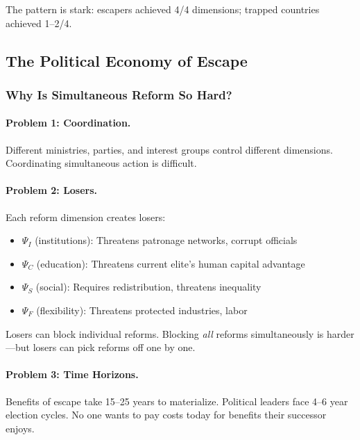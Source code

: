 The pattern is stark: escapers achieved 4/4 dimensions; trapped countries 
achieved 1--2/4.

\subsection{The Political Economy of Escape}

\subsubsection{Why Is Simultaneous Reform So Hard?}

\paragraph{Problem 1: Coordination.}
Different ministries, parties, and interest groups control different dimensions.
Coordinating simultaneous action is difficult.

\paragraph{Problem 2: Losers.}
Each reform dimension creates losers:
\begin{itemize}
    \item $\Psi_I$ (institutions): Threatens patronage networks, corrupt officials
    \item $\Psi_C$ (education): Threatens current elite's human capital advantage
    \item $\Psi_S$ (social): Requires redistribution, threatens inequality
    \item $\Psi_F$ (flexibility): Threatens protected industries, labor
\end{itemize}

Losers can block individual reforms. Blocking \emph{all} reforms simultaneously 
is harder---but losers can pick reforms off one by one.

\paragraph{Problem 3: Time Horizons.}
Benefits of escape take 15--25 years to materialize. Political leaders face 
4--6 year election cycles. No one wants to pay costs today for benefits 
their successor enjoys.

